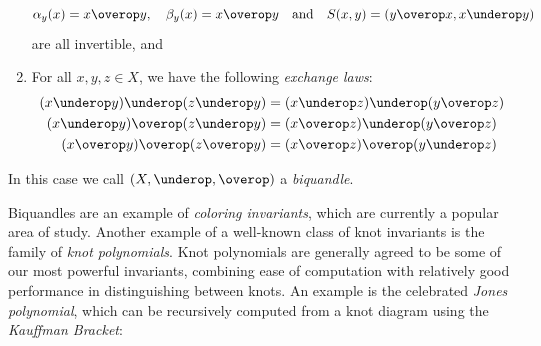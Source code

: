\begin{example}[Biquandles]
\begin{enumerate}
      \[
      \alpha_y(x) = x \overop y, \quad \beta_y(x) = x \overop y \quad
      \text{and} \quad S(x,y) = (y \overop x, x \underop y)
      \]
      are all invertible, and
    \item For all $x,y,z \in X$, we have the following \emph{exchange
      laws}:
      \begin{align*}
        (x \underop y) \underop (z \underop y)
        &= (x \underop z) \underop (y \overop z) \\
        (x \underop y) \overop (z \underop y)
        &= (x \overop z) \underop (y \overop z) \\
        (x \overop y) \overop (z \overop y)
        &= (x \overop z) \overop (y \underop z)
      \end{align*}
  \end{enumerate}
  In this case we call $(X, \underop, \overop)$ a \emph{biquandle}.
\end{example}
Biquandles are an example of \emph{coloring invariants}, which are
currently a popular area of study. Another example of a well-known
class of knot invariants is the family of \emph{knot polynomials}.
Knot polynomials are generally agreed to be some of our most powerful
invariants, combining ease of computation with relatively good
performance in distinguishing between knots. An example is the
celebrated \emph{Jones polynomial}, which can be recursively computed
from a knot diagram using the \emph{Kauffman Bracket}:
